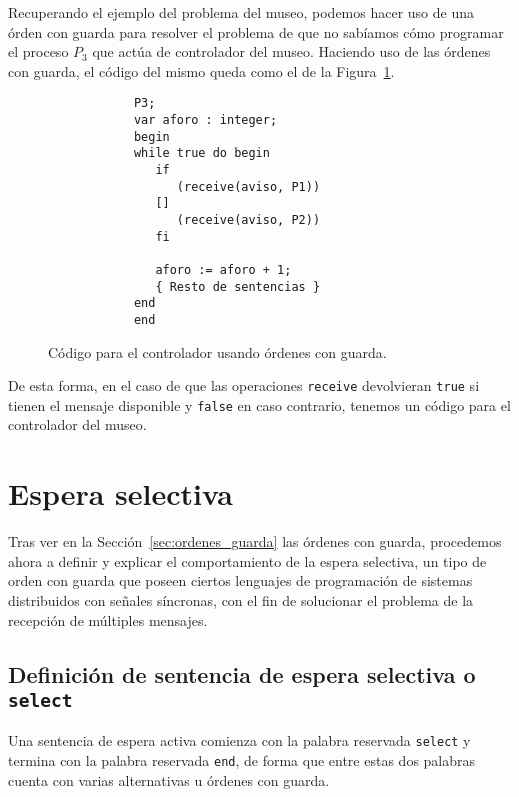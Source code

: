 \begin{ejemplo}
    Recuperando el ejemplo del problema del museo, podemos hacer uso de una órden con guarda para resolver el problema de que no sabíamos cómo programar el proceso $P_3$ que actúa de controlador del museo. Haciendo uso de las órdenes con guarda, el código del mismo queda como el de la Figura~\ref{fig:cod_museo_guarda}.
    \begin{figure}[H]
        \centering
        \begin{verbatim}
            P3;
            var aforo : integer;
            begin
            while true do begin
               if
                  (receive(aviso, P1))
               []
                  (receive(aviso, P2))
               fi

               aforo := aforo + 1;
               { Resto de sentencias }
            end
            end
        \end{verbatim}
        \caption{Código para el controlador usando órdenes con guarda.}
        \label{fig:cod_museo_guarda}
    \end{figure}
    De esta forma, en el caso de que las operaciones \verb|receive| devolvieran \verb|true| si tienen el mensaje disponible y \verb|false| en caso contrario, tenemos un código para el controlador del museo.
\end{ejemplo}

\section{Espera selectiva}
Tras ver en la Sección~\ref{sec:ordenes_guarda} las órdenes con guarda, procedemos ahora a definir y explicar el comportamiento de la espera selectiva, un tipo de orden con guarda que poseen ciertos lenguajes de programación de sistemas distribuidos con señales síncronas, con el fin de solucionar el problema de la recepción de múltiples mensajes.

\subsection{Definición de sentencia de espera selectiva o \texttt{select}}
Una sentencia de espera activa comienza con la palabra reservada \verb|select| y termina con la palabra reservada \verb|end|, de forma que entre estas dos palabras cuenta con varias alternativas u órdenes con guarda.

